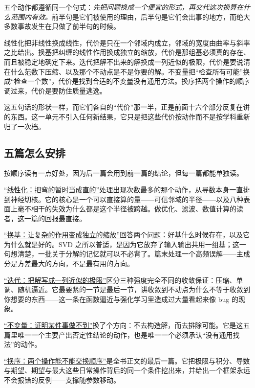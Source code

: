 五个动作都遵循同一个句式：\emph{先把问题换成一个便宜的形式，再交代这次换算在什么范围内有效。}前半句是它们被使用的理由，后半句是它们会出事的地方，而绝大多数事故发生在只做了前半句的时候。

线性化把非线性换成线性，代价是只在一个邻域内成立，邻域的宽度由曲率与斜率之比给出。换基把纠缠的线性作用换成独立的缩放，代价是那组基必须真的存在、而且被稳定地确定下来。迭代把解不出来的解换成一列近似的极限，代价是要说清在什么范数下压缩、以及那个不动点是不是你要的解。不变量把``检查所有可能''换成``检查一个数''，代价是找到合适的不变量没有通用方法。换序把两个操作的顺序调过来，代价是要防住质量逃逸。

这五句话的形状一样，而它们各自的``代价''那一半，正是前面十六个部分反复在讲的东西。这一单元不引入任何新结果，它只是把这些代价按动作而不是按学科重新归了一次档。

\subsection{五篇怎么安排}

按顺序读有一点好处，因为后一篇会用到前一篇的结论，但每一篇都能单独读。

\hyperref[sec:17-Synthesis/02-Recurring-Ideas/01]{``线性化：把弯的暂时当成直的''}处理出现次数最多的那个动作，从导数本身一直排到神经切核。它的核心是一个可以直接算的量——可信邻域的半径——以及八种表面上毫不相干的失效为什么都是这个半径被跨越。做优化、滤波、数值计算的读者，这一篇的回报最直接。

\hyperref[sec:17-Synthesis/02-Recurring-Ideas/02]{``换基：让复杂的作用变成独立的缩放''}回答两个问题：好基什么时候存在，以及它为什么就是好的。SVD 之所以普适，是因为它放弃了输入输出共用一组基；这一句想清楚，一批关于分解的记忆就可以不必背了。篇末处理一个高频误解——主成分是方差最大的方向，不是最有用的方向。

\hyperref[sec:17-Synthesis/02-Recurring-Ideas/03]{``迭代：把解写成一列近似的极限''}区分三种强度完全不同的收敛保证：压缩、单调、随机逼近。它最要紧的一节是最后一节，讲收敛到不动点为什么不等于收敛到你想要的东西——这一条在函数逼近与强化学习里造成过大量看起来像 bug 的现象。

\hyperref[sec:17-Synthesis/02-Recurring-Ideas/04]{``不变量：证明某件事做不到''}换了个方向：不去构造解，而去排除可能。它是这五篇里唯一一个主要产出否定性结论的动作，也是唯一一个必须承认``没有通用找法''的动作。

\hyperref[sec:17-Synthesis/02-Recurring-Ideas/05]{``换序：两个操作能不能交换顺序''}是全书正文的最后一篇。它把极限与积分、导数与期望、期望与最大这些日常操作背后的同一个条件挖出来，并给出一个框架永远不会报错的反例——支撑随参数移动。

